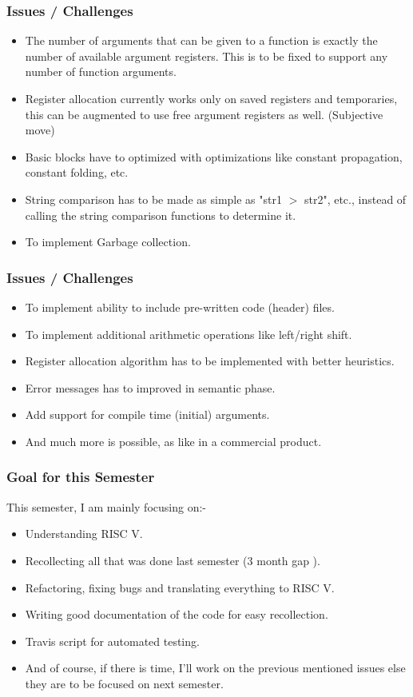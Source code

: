\documentclass{beamer}
\begin{document}
\begin{frame}[fragile]
  \frametitle{Issues / Challenges}
  \begin{itemize}
  \item The number of arguments that can be given to a function is exactly the number of available argument registers. This is to be fixed to support any number of function arguments.
  \pause
  \item Register allocation currently works only on saved registers and temporaries, this can be augmented to use free argument registers as well. (Subjective move)
  \pause
  \item Basic blocks have to optimized with optimizations like constant propagation, constant folding, etc.
  \pause
  \item String comparison has to be made as simple as "str1 $>$ str2", etc.,  instead of calling the string comparison functions to determine it.
  \pause
  \item To implement Garbage collection.
  \end{itemize}
\end{frame}
\begin{frame}
  \frametitle{Issues / Challenges}
  \begin{itemize}
  \item To implement ability to include pre-written code (header) files.
  \pause
  \item To implement additional arithmetic operations like left/right shift.
  \pause
  \item Register allocation algorithm has to be implemented with better heuristics.
  \pause
  \item Error messages has to improved in semantic phase. 
  \pause
  \item Add support for compile time (initial) arguments.
  \pause
  \item And much more is possible, as like in a commercial product.
  \end{itemize}
\end{frame}
\begin{frame}
  \frametitle{Goal for this Semester}
  This semester, I am mainly focusing on:-
  \begin{itemize}
    \pause
    \item Understanding RISC V.
    \pause 
    \item Recollecting all that was done last semester (3 month gap \Xey). %
    \pause
    \item Refactoring, fixing bugs and translating everything to RISC V.
    \pause
    \item Writing good documentation of the code for easy recollection.
    \pause 
    \item Travis script for automated testing.
    \pause 
    \item And of course, if there is time, I'll work on the previous mentioned issues else they are to be focused on next semester.
  \end{itemize}
\end{frame}
\end{document}

